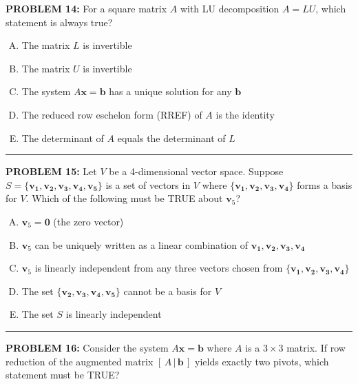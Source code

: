 \documentclass[12pt]{amsart}
\newcommand{\divider}{
  \vspace{-1em} %
  \noindent
  \raisebox{-0.15ex}{\textbullet}%
  \hspace{0.5em}%
  \rule[0.5ex]{0.95\textwidth}{1.0pt}%
  \hspace{0.5em}%
  \raisebox{-0.15ex}{\textbullet}%
  \vspace{0em} %
}
\begin{document}
{\bf PROBLEM 14:}
For a square matrix $A$ with LU decomposition $A = LU$, which statement is always true?

\begin{enumerate}[(A)]
\item The matrix $L$ is invertible
\item The matrix $U$ is invertible  
\item The system $A\mathbf{x} = \mathbf{b}$ has a unique solution for any $\mathbf{b}$
\item The reduced row eschelon form (RREF) of $A$ is the identity
\item The determinant of $A$ equals the determinant of $L$
\end{enumerate}
\divider



{\bf PROBLEM 15:}
Let $V$ be a 4-dimensional vector space. Suppose $S = \{\mathbf{v_1, v_2, v_3, v_4, v_5}\}$ is a set of vectors in $V$ where $\{\mathbf{v_1, v_2, v_3, v_4}\}$ forms a basis for $V$. Which of the following must be TRUE about $\mathbf{v}_5$?

\begin{enumerate}[(A)]
\item $\mathbf{v}_5 = \mathbf{0}$ (the zero vector)
\item $\mathbf{v}_5$ can be uniquely written as a linear combination of $\mathbf{v_1, v_2, v_3, v_4}$
\item $\mathbf{v}_5$ is linearly independent from any three vectors chosen from $\{\mathbf{v_1, v_2, v_3, v_4}\}$
\item The set $\{\mathbf{v_2, v_3, v_4, v_5}\}$ cannot be a basis for $V$
\item The set $S$ is linearly independent
\end{enumerate}
\divider



{\bf PROBLEM 16:}
Consider the system $A\mathbf{x} = \mathbf{b}$ where $A$ is a $3 \times 3$ matrix. If row reduction of the augmented matrix $[\, A\, |\, \mathbf{b}\, ]$ yields exactly two pivots, which statement must be TRUE?
\end{document}
